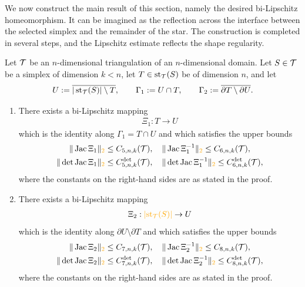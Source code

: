 \documentclass[10pt,letterpaper]{article}
\newcommand\cye[1]{%
  \protect\leavevmode
  \begingroup
    \color{red!35!yellow}%
    #1%
  \endgroup
}
\begin{document}
We now construct the main result of this section, namely the desired bi-Lipschitz homeomorphism. 
It can be imagined as the reflection across the interface between the selected simplex and the remainder of the star. 
The construction is completed in several steps,
and the Lipschitz estimate reflects the shape regularity. 


\begin{proposition}\label{proposition:starreflection}
    Let ${\mathcal T}$ be an $n$-dimensional triangulation of an $n$-dimensional domain. 
    Let $S \in {\mathcal T}$ be a simplex of dimension $k < n$,
    let $T \in \operatorname{st}_{{\mathcal T}}(S)$ be of dimension $n$,
    and let 
    \begin{align*}
        U := \overline{ |\operatorname{st}_{{\mathcal T}}(S)| \setminus T },
        \qquad 
        {\Gamma_1} := U \cap T,
        \qquad 
        {\Gamma_2} := \overline{ \partial T \setminus \partial U }.
    \end{align*}
    \begin{enumerate}
    \item 
    There exists a bi-Lipschitz mapping
    \begin{align*}
        \Xi_{1} : T \rightarrow U
    \end{align*}
    which is the identity along ${\Gamma_1} = T \cap U$ and which satisfies the upper bounds 
    \begin{gather*}
        \| \Jacobian\Xi_{1} \|_{\cye{2}}          \leq \Cfive{n}{k}(\calT),
        \quad 
        \| \Jacobian\Xi_{1}^{-1} \|_{\cye{2}}     \leq \Csechs{n}{k}(\calT),
        \\
        \| \det\Jacobian\Xi_{1} \|_{\cye{2}}      \leq \Cdetfive{n}{k}(\calT),
        \quad 
        \| \det\Jacobian\Xi_{1}^{-1} \|_{\cye{2}} \leq \Cdetsechs{n}{k}(\calT),
    \end{gather*}
    where the constants on the right-hand sides are as stated in the proof. 
    \item 
    There exists a bi-Lipschitz mapping
    \begin{align*}
        \Xi_{2} : \cye{\underlying{\patch_{\calT}(S)}} \rightarrow U
    \end{align*}
    which is the identity along $\partial U \setminus \partial T$ and which satisfies the upper bounds 
    \begin{gather*}
        \| \Jacobian\Xi_{2} \|_{\cye{2}}          \leq \Csieb{n}{k}(\calT),
        \quad 
        \| \Jacobian\Xi_{2}^{-1} \|_{\cye{2}}     \leq \Cacht{n}{k}(\calT),
        \\
        \| \det\Jacobian\Xi_{2} \|_{\cye{2}}      \leq \Cdetsieb{n}{k}(\calT),
        \quad 
        \| \det\Jacobian\Xi_{2}^{-1} \|_{\cye{2}} \leq \Cdetacht{n}{k}(\calT),
    \end{gather*}
    where the constants on the right-hand sides are as stated in the proof. 
    \end{enumerate}
\end{proposition}
\end{document}
